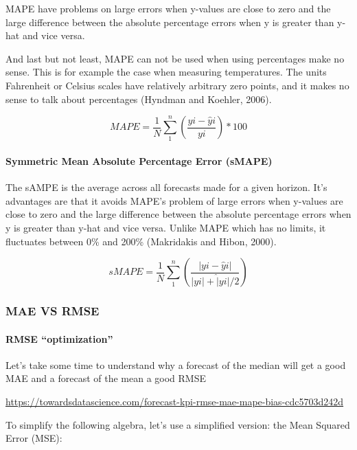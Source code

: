 \documentclass[
]{article}
\begin{document}
MAPE have problems on large errors when y-values are close to zero and
the large difference between the absolute percentage errors when y is
greater than y-hat and vice versa.

And last but not least, MAPE can not be used when using percentages make
no sense. This is for example the case when measuring temperatures. The
units Fahrenheit or Celsius scales have relatively arbitrary zero
points, and it makes no sense to talk about percentages (Hyndman and
Koehler, 2006).

\[ MAPE = \frac{1}{N}\sum_{1}^{n}\left (\frac{yi-\hat yi }{yi} \right)*100  \]

\hypertarget{symmetric-mean-absolute-percentage-error-smape}{%
\paragraph{Symmetric Mean Absolute Percentage Error
(sMAPE)}\label{symmetric-mean-absolute-percentage-error-smape}}

The sAMPE is the average across all forecasts made for a given horizon.
It's advantages are that it avoids MAPE's problem of large errors when
y-values are close to zero and the large difference between the absolute
percentage errors when y is greater than y-hat and vice versa. Unlike
MAPE which has no limits, it fluctuates between 0\% and 200\%
(Makridakis and Hibon, 2000).

\[ sMAPE = \frac{1}{N}\sum_{1}^{n}\left(\frac{|yi-\hat yi |}{|yi|+\hat |yi|/2} \right) \]

\hypertarget{mae-vs-rmse}{%
\subsubsection{MAE VS RMSE}\label{mae-vs-rmse}}

\hypertarget{rmse-optimization}{%
\paragraph{RMSE ``optimization''}\label{rmse-optimization}}

Let's take some time to understand why a forecast of the median will get
a good MAE and a forecast of the mean a good RMSE

\url{https://towardsdatascience.com/forecast-kpi-rmse-mae-mape-bias-cdc5703d242d}

To simplify the following algebra, let's use a simplified version: the
Mean Squared Error (MSE):
\end{document}
